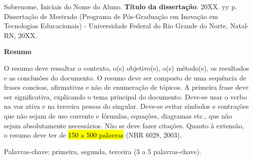\vspace{1cm}

\vspace{1cm}

\begin{resumo}[]
Sobrenome, Iniciais do Nome do Aluno. \textbf{Título da dissertação}. 20XX. yy p. Dissertação de Mestrado (Programa de Pós-Graduação em Inovação em Tecnologias Educacionais) - Universidade Federal do Rio Grande do Norte, Natal-RN, 20XX.
\vspace{\onelineskip}
\vspace{\onelineskip}

\textbf{Resumo}
 
  O resumo deve ressaltar o contexto, o(s) objetivo(s), o(s) método(s), os resultados e as conclusões do documento. O resumo deve ser composto de uma sequência de frases concisas, afirmativas e não de enumeração de tópicos. A primeira frase deve ser significativa, explicando o tema principal do documento. Deve-se usar o verbo na voz ativa e na terceira pessoa do singular. Deve-se evitar símbolos e contrações que não sejam de uso corrente e fórmulas, equações, diagramas etc., que não sejam absolutamente necessários. Não se deve fazer citações. Quanto à extensão, o resumo deve ter de \hl{150 a 500 palavras} (NBR 6028, 2003).
  \vspace*{\fill}

  \noindent
  Palavras-chave: primeira, segunda, terceira (3 a 5 palavras-chave).
\end{resumo}